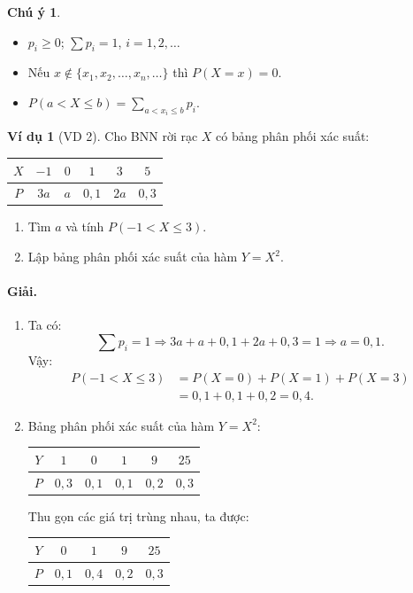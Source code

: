 \documentclass[12pt,a4paper]{article}
\theoremstyle{definition}
\newtheorem{vidu}{Ví dụ}[section]
\newtheorem{chuy}{Chú ý}[section]
\begin{document}
\begin{chuy}
\begin{itemize}
    \item $p_i \ge 0$; $\sum p_i = 1$, $i = 1, 2, \dots$
    \item Nếu $x \notin \{x_1, x_2, \dots, x_n, \dots\}$ thì $P(X = x) = 0$.
    \item $P(a < X \le b) = \displaystyle\sum_{a < x_i \le b} p_i$.
\end{itemize}
\end{chuy}

\begin{vidu}[VD 2]
Cho BNN rời rạc $X$ có bảng phân phối xác suất:
\begin{center}
\begin{tabular}{|c|c|c|c|c|c|}
\hline
$X$ & $-1$ & $0$ & $1$ & $3$ & $5$ \\
\hline
$P$ & $3a$ & $a$ & $0{,}1$ & $2a$ & $0{,}3$ \\
\hline
\end{tabular}
\end{center}
\begin{enumerate}[label=\arabic*)]
    \item Tìm $a$ và tính $P(-1 < X \le 3)$.
    \item Lập bảng phân phối xác suất của hàm $Y = X^2$.
\end{enumerate}

\paragraph{Giải.}
\begin{enumerate}[label=\arabic*)]
    \item Ta có:
    \[
    \sum p_i = 1 \Rightarrow 3a + a + 0{,}1 + 2a + 0{,}3 = 1 \Rightarrow a = 0{,}1.
    \]
    Vậy:
    \begin{align*}
    P(-1 < X \le 3) &= P(X = 0) + P(X = 1) + P(X = 3) \\
    &= 0{,}1 + 0{,}1 + 0{,}2 = 0{,}4.
    \end{align*}
    \item Bảng phân phối xác suất của hàm $Y = X^2$:
    \begin{center}
    \begin{tabular}{|c|c|c|c|c|c|}
    \hline
    $Y$ & $1$ & $0$ & $1$ & $9$ & $25$ \\
    \hline
    $P$ & $0{,}3$ & $0{,}1$ & $0{,}1$ & $0{,}2$ & $0{,}3$ \\
    \hline
    \end{tabular}
    \end{center}
    Thu gọn các giá trị trùng nhau, ta được:
    \begin{center}
    \begin{tabular}{|c|c|c|c|c|}
    \hline
    $Y$ & $0$ & $1$ & $9$ & $25$ \\
    \hline
    $P$ & $0{,}1$ & $0{,}4$ & $0{,}2$ & $0{,}3$ \\
    \hline
    \end{tabular}
    \end{center}
\end{enumerate}
\end{vidu}
\end{document}
